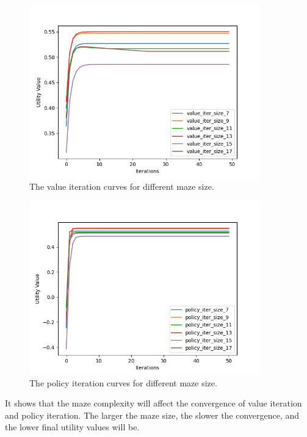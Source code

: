 \documentclass{article}
\begin{document}
\begin{figure}[H]
    \includegraphics[width=100mm]{../results/value_iteration_curves.png}
    \caption{The value iteration curves for different maze size.}
    \label{fig:value_iteration_convergence}
\end{figure}

\begin{figure}[H]
    \includegraphics[width=100mm]{../results/policy_iteration_curves.png}
    \caption{The policy iteration curves for different maze size.}
    \label{fig:policy_iteration_convergence}
\end{figure}

It shows that the maze complexity will affect the convergence of value iteration and policy iteration. The larger the maze size, the slower the convergence, and the lower final utility values will be.
\end{document}

